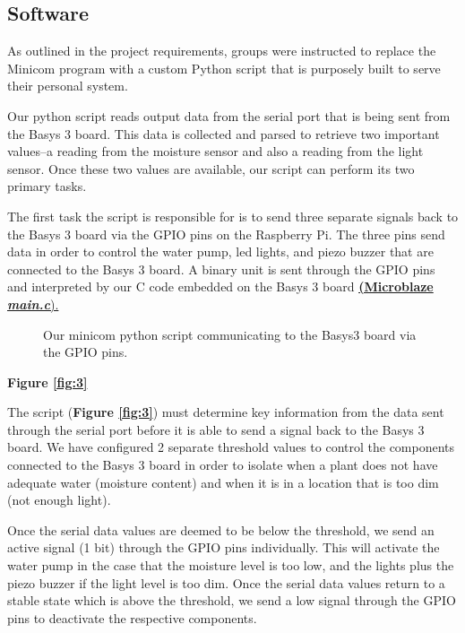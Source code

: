 \documentclass[a4paper]{article}
\begin{document}
\newpage
\subsection{Software}

As outlined in the project requirements, groups were instructed to replace the Minicom program with a custom Python script that is purposely built to serve their personal system. 

Our python script reads output data from the serial port that is being sent from the Basys 3 board. This data is collected and parsed to retrieve two important values--a reading from the moisture sensor and also a reading from the light sensor. Once these two values are available, our script can perform its two primary tasks.

The first task the script is responsible for is to send three separate signals back to the Basys 3 board via the GPIO pins on the Raspberry Pi. The three pins send data in order to control the water pump, led lights, and piezo buzzer that are connected to the Basys 3 board. A binary unit is sent through the GPIO pins and interpreted by our C code embedded on the Basys 3 board \hyperref[sec:microblaze]{\textbf{(Microblaze {\it main.c}}).}

\begin{figure}
  \caption{Our minicom python script communicating to the Basys3 board via the GPIO pins.}
  \label{fig:1}
\end{figure}

\textbf{Figure \ref{fig:3}}

The script (\textbf{Figure \ref{fig:3}}) must determine key information from the data sent through the serial port before it is able to send a signal back to the Basys 3 board. We have configured 2 separate threshold values to control the components connected to the Basys 3 board in order to isolate when a plant does not have adequate water (moisture content) and when it is in a location that is too dim (not enough light).

Once the serial data values are deemed to be below the threshold, we send an active signal (1 bit) through the GPIO pins individually. This will activate the water pump in the case that the moisture level is too low, and the lights plus the piezo buzzer if the light level is too dim. Once the serial data values return to a stable state which is above the threshold, we send a low signal through the GPIO pins to deactivate the respective components.
\end{document}
